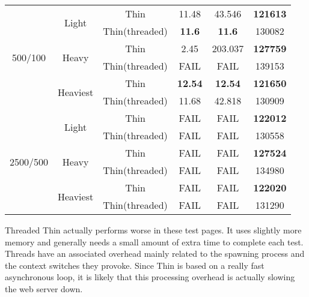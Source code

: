 \begin{table}[ht]
\begin{tabular}{|c|c|c|c|c|c|}
\multirow{6}{*}{500/100} & \multirow{2}{*}{Light} & Thin & 11.48 & 43.546 & \textbf{121613}\\\cline{3-6}
 &  & Thin(threaded) & \textbf{11.6} & \textbf{\textbf{11.6}} & 130082\\\cline{2-6}
 & \multirow{2}{*}{Heavy} & Thin & 2.45 & 203.037 & \textbf{127759}\\\cline{3-6}
 &  & Thin(threaded) & FAIL & FAIL & 139153\\\cline{2-6}
 & \multirow{2}{*}{Heaviest} & Thin & \textbf{12.54} & \textbf{\textbf{12.54}} & \textbf{121650}\\\cline{3-6}
 &  & Thin(threaded) & 11.68 & 42.818 & 130909\\\hline
\multirow{6}{*}{2500/500} & \multirow{2}{*}{Light} & Thin & FAIL & FAIL & \textbf{122012}\\\cline{3-6}
 &  & Thin(threaded) & FAIL & FAIL & 130558\\\cline{2-6}
 & \multirow{2}{*}{Heavy} & Thin & FAIL & FAIL & \textbf{127524}\\\cline{3-6}
 &  & Thin(threaded) & FAIL & FAIL & 134980\\\cline{2-6}
 & \multirow{2}{*}{Heaviest} & Thin & FAIL & FAIL & \textbf{122020}\\\cline{3-6}
 &  & Thin(threaded) & FAIL & FAIL & 131290\\\hline
  \end{tabular}
  
  \label{tab:thin_threaded_benchmark}
\end{table}

Threaded Thin actually performs worse in these test pages. It uses slightly more memory and generally needs a small amount of extra time to complete each test. Threads have an associated overhead mainly related to the spawning process and the context switches they provoke. Since Thin is based on a really fast asynchronous loop, it is likely that this processing overhead is actually slowing the web server down.

